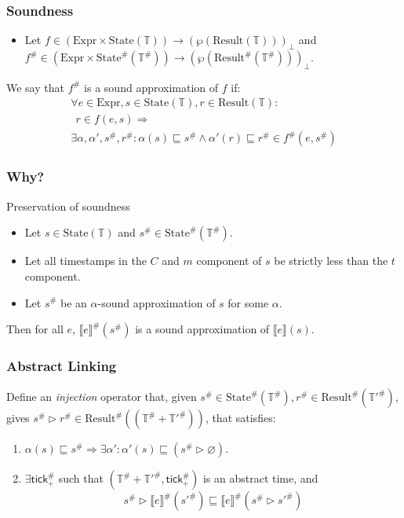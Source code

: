 \documentclass{beamer}
\newcommand*{\A}[1]{{#1}^{\#}}
\newcommand*{\Expr}{\text{Expr}}
\newcommand*{\Time}{\mathbb{T}}
\newcommand*{\ATime}{\A{\Time}}
\newcommand*{\mem}{m}
\newcommand*{\State}[1]{\text{State}({#1})}
\newcommand*{\AState}[1]{\A{\text{State}}({#1})}
\newcommand*{\Result}[1]{\text{Result}({#1})}
\newcommand*{\AResult}[1]{\A{\text{Result}}({#1})}
\newcommand*{\sembracket}[1]{\lBrack{#1}\rBrack}
\newcommand*{\tick}{\mathsf{tick}}
\begin{document}
\begin{frame}[c]
  \frametitle{Soundness}
  \begin{definition}
    \begin{itemize}
      \item Let $f\in(\Expr\times\State{\Time})\rightarrow(\wp(\Result{\Time}))_{\bot}$ and $\A{f}\in(\Expr\times\AState{\ATime})\rightarrow(\wp(\AResult{\ATime}))_{\bot}$.
    \end{itemize}

    We say that $\A{f}$ is a sound approximation of $f$ if:
    \begin{align*}
      \forall e\in\Expr,s\in\State{\Time},r\in\Result{\Time}: \\
      \:\:r\in f(e,s)\Rightarrow                              \\
      \exists\alpha,\alpha',\A{s},\A{r}:\alpha(s)\sqsubseteq\A{s}\wedge\alpha'(r)\sqsubseteq\A{r}\in\A{f}(e,\A{s})
    \end{align*}
  \end{definition}
\end{frame}
\begin{frame}
  \frametitle{Why?}
  \begin{block}{Preservation of soundness}
    \begin{itemize}
      \item Let $s\in\State{\Time}$ and $\A{s}\in\AState{\ATime}$.
      \item Let all timestamps in the $C$ and $\mem$ component of $s$ be strictly less than the $t$ component.
      \item Let $\A{s}$ be an $\alpha$-sound approximation of $s$ for some $\alpha$.
    \end{itemize}

    Then for all $e$, $\A{\sembracket{e}}(\A{s})$ is a sound approximation of $\sembracket{e}(s)$.
  \end{block}
\end{frame}
\begin{frame}[c]
  \frametitle{Abstract Linking}
  Define an \emph{injection} operator that, given $\A{s}\in\AState{\ATime},\A{r}\in\AResult{\A{\Time'}}$, gives $\A{s}\rhd\A{r}\in\AResult{(\ATime+\A{\Time'})}$, that satisfies:
  \begin{enumerate}
    \item $\alpha(s)\sqsubseteq\A{s}\Rightarrow\exists\alpha':\alpha'(s)\sqsubseteq(\A{s}\rhd\varnothing)$.
    \item $\exists\A{\tick}_{+}$ such that $(\ATime+\A{\Time'},\A{\tick}_{+})$ is an abstract time, and
          \[
            \A{s}\rhd\A{\sembracket{e}}(\A{s'})\sqsubseteq\A{\sembracket{e}}(\A{s}\rhd\A{s'})
          \]
  \end{enumerate}
\end{frame}
\end{document}
